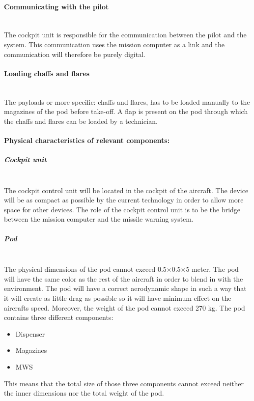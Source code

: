 \paragraph{Communicating with the pilot}  \makebox{} \\
The cockpit unit is responsible for the communication between the pilot and the system. This communication uses the mission computer as a link and the communication will therefore be purely digital.

\paragraph{Loading chaffs and flares}  \makebox{} \\
The payloads or more specific: chaffs and flares, has to be loaded manually to the magazines of the pod before take-off. A flap is present on the pod through which the chaffs and flares can be loaded by a technician.

\paragraph{Physical characteristics of relevant components:} 

\subparagraph{Cockpit unit}  \makebox{} \\
The cockpit control unit will be located in the cockpit of the aircraft. The device will be as compact as possible by the current technology in order to allow more space for other devices. The role of the cockpit control unit is to be the bridge between the mission computer and the missile warning system.

\subparagraph{Pod}  \makebox{} \\
The physical dimensions of the pod cannot exceed 0.5$\times$0.5$\times$5 meter. The pod will have the same color as the rest of the aircraft in order to blend in with the environment. The pod will have a correct aerodynamic shape in such a way that it will create as little drag as possible so it will have minimum effect on the aircrafts speed.  Moreover, the weight of the pod cannot exceed 270 kg.
The pod contains three different components:
\begin{itemize}
\item Dispenser
\item Magazines
\item MWS
\end{itemize}

This means that the total size of those three components cannot exceed neither the inner dimensions nor the total weight of the pod. 



